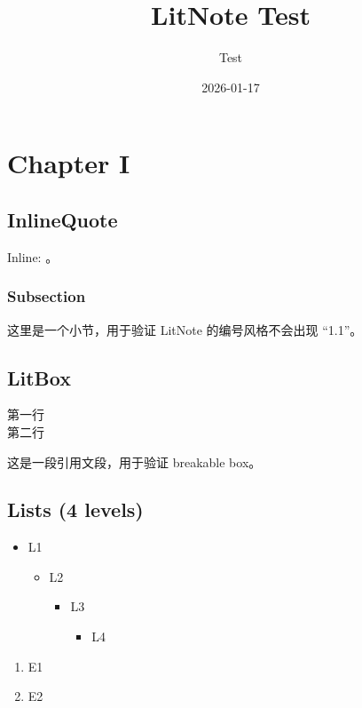 \documentclass[lists=true,litbox=true,colorscheme=CN]{Hypo-LitNote}
\title{LitNote Test}
\author{Test}
\date{2026-01-17}
\begin{document}
\maketitle
\tableofcontents

\chapter{Chapter I}

\section{InlineQuote}
Inline: 。

\subsection{Subsection}
这里是一个小节，用于验证 LitNote 的编号风格不会出现 “1.1”。

\section{LitBox}
\begin{poem}[title={Poem Title}]
第一行\\
第二行
\end{poem}

\begin{quotepara}[title={Quote Title}]
这是一段引用文段，用于验证 breakable box。
\end{quotepara}

\section{Lists (4 levels)}
\begin{itemize}
  \item L1
  \begin{itemize}
    \item L2
    \begin{itemize}
      \item L3
      \begin{itemize}
        \item L4
      \end{itemize}
    \end{itemize}
  \end{itemize}
\end{itemize}

\begin{enumerate}
  \item E1
  \item E2
\end{enumerate}
\end{document}
